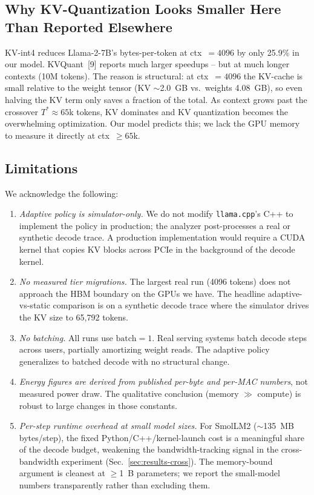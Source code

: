 \documentclass[conference]{IEEEtran}
\begin{document}
\subsection{Why KV-Quantization Looks Smaller Here Than Reported Elsewhere}

KV-int4 reduces Llama-2-7B's bytes-per-token at ctx~$=4096$ by only 25.9\% in our model. KVQuant~[9] reports much larger speedups -- but at much longer contexts (10M tokens). The reason is structural: at ctx~$=4096$ the KV-cache is small relative to the weight tensor (KV $\sim$2.0~GB vs.\ weights 4.08~GB), so even halving the KV term only saves a fraction of the total. As context grows past the crossover $T^* \approx 65$k tokens, KV dominates and KV quantization becomes the overwhelming optimization. Our model predicts this; we lack the GPU memory to measure it directly at ctx~$\geq 65$k.

\subsection{Limitations}

We acknowledge the following:
\begin{enumerate}
\item \emph{Adaptive policy is simulator-only.} We do not modify \texttt{llama.cpp}'s C++ to implement the policy in production; the analyzer post-processes a real or synthetic decode trace. A production implementation would require a CUDA kernel that copies KV blocks across PCIe in the background of the decode kernel.
\item \emph{No measured tier migrations.} The largest real run (4096 tokens) does not approach the HBM boundary on the GPUs we have. The headline adaptive-vs-static comparison is on a synthetic decode trace where the simulator drives the KV size to 65{,}792 tokens.
\item \emph{No batching.} All runs use $\text{batch}{=}1$. Real serving systems batch decode steps across users, partially amortizing weight reads. The adaptive policy generalizes to batched decode with no structural change.
\item \emph{Energy figures are derived from published per-byte and per-MAC numbers}, not measured power draw. The qualitative conclusion (memory $\gg$ compute) is robust to large changes in those constants.
\item \emph{Per-step runtime overhead at small model sizes.} For SmolLM2 ($\sim$135~MB bytes/step), the fixed Python/C++/kernel-launch cost is a meaningful share of the decode budget, weakening the bandwidth-tracking signal in the cross-bandwidth experiment (Sec.~\ref{sec:results-cross}). The memory-bound argument is cleanest at $\geq$1~B parameters; we report the small-model numbers transparently rather than excluding them.
\end{enumerate}
\end{document}
